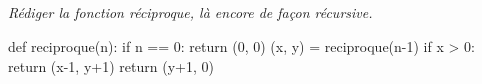 \documentclass[10pt,fleqn]{book} %
\begin{document}
\begin{multicols}{2}
\subparagraph{}\textit{Rédiger la fonction réciproque, là encore de façon récursive.}
\ifprof
\begin{corrige}
\begin{python}
def reciproque(n):
    if n == 0:
        return (0, 0)
    (x, y) = reciproque(n-1)
    if x > 0:
        return (x-1, y+1)
    return (y+1, 0)
\end{python}
\end{corrige}
\else
\fi

%
%

%
%
%
%
%
%
%
%


\end{multicols}
\end{document}
